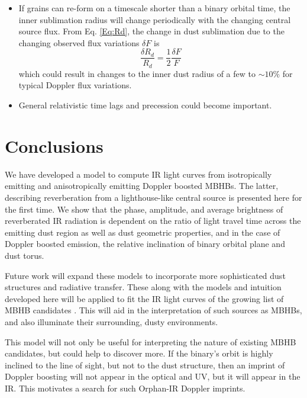 \begin{itemize}
 \item If grains can re-form on a timescale shorter than a binary orbital time, the inner sublimation radius will change periodically with the changing central source flux. From Eq. \ref{Eq:Rd}, the change in dust sublimation due to the changing observed flux variations $\delta F$ is
 \begin{equation}
 \frac{\delta R_d}{R_d} = \frac{1}{2} \frac{\delta F}{F}
 \end{equation}
which could result in changes to the inner dust radius of a few to $\sim 10 \%$ for typical Doppler flux variations.


\item General relativistic time lags and precession could become important. 


\end{itemize}


\section{Conclusions}
\label{S:conclusions}
We have developed a model to compute IR light curves from isotropically
emitting and anisotropically emitting Doppler boosted MBHBs. The latter,
describing reverberation from a lighthouse-like central source is presented
here for the first time. We show that the phase, amplitude, and average
brightness of reverberated IR radiation is dependent on the ratio of light
travel time across the emitting dust region as well as dust geometric
properties, and in the case of Doppler boosted emission, the relative
inclination of binary orbital plane and dust torus. 

Future work will expand these models to incorporate more sophisticated dust
structures and radiative transfer. These along with the models and intuition
developed here will be applied to fit the IR light curves of the growing list
of MBHB candidates \citep{Graham+2015b, Charisi+2016, Jun:2015}. This will aid
in the interpretation of such sources as MBHBs, and also illuminate their
surrounding, dusty environments.



This model will not only be useful for interpreting the nature of existing
MBHB candidates, but could help to discover more. If the binary's orbit is
highly inclined to the line of sight, but not to the dust structure, then an
imprint of Doppler boosting will not appear in the optical and UV, but it will
appear in the IR. This motivates a search for such Orphan-IR Doppler imprints.



\renewcommand\thesection{\thechapter.\arabic{section}}